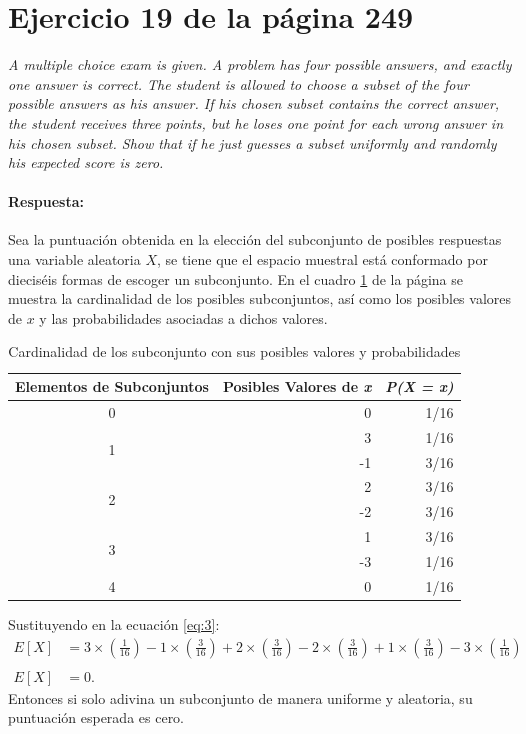 \documentclass{article}
\begin{document}
\section{Ejercicio 19 de la página 249}  
\emph{A multiple choice exam is given. A problem has four possible answers, and exactly one answer is correct. The student is allowed to choose a subset of the four possible answers as his answer. If his chosen subset contains the correct answer, the student receives three points, but he loses one point for each wrong answer in his chosen subset. Show that if he just guesses a subset uniformly and randomly his expected score is zero.}

\paragraph{Respuesta:} Sea la puntuación obtenida en la elección del subconjunto de posibles respuestas una variable aleatoria $X$, se tiene que el espacio muestral está conformado por dieciséis formas de escoger un subconjunto.  En el cuadro \ref{tab:6} de la página \pageref{tab:6} se muestra la cardinalidad de los posibles subconjuntos, así como los posibles valores de $x$ y las probabilidades asociadas a dichos valores.
\begin{table}[H]
  \centering
  \caption{Cardinalidad de los subconjunto con  sus posibles valores y probabilidades}
    \begin{tabular}{crr}
    \toprule
    \multicolumn{1}{p{7em}}{\textbf{Elementos de Subconjuntos}} & \multicolumn{1}{p{5.39em}}{\textbf{Posibles Valores de \textit{\textbf{x}}}} & \multicolumn{1}{c}{\textit{\textbf{P(X = x)}}} \\
    \midrule
    0     & 0     & 1/16 \\
    \midrule
    \multirow{2}[2]{*}{1} & 3     & 1/16 \\
          & -1    & 3/16 \\
    \midrule
    \multirow{2}[2]{*}{2} & 2     & 3/16 \\
          & -2    & 3/16 \\
    \midrule
    \multirow{2}[2]{*}{3} & 1     & 3/16 \\
          & -3    & 1/16 \\
    \midrule
    4     & 0     & 1/16 \\
    \bottomrule
    \end{tabular}%
  \label{tab:6}%
\end{table}%

Sustituyendo en la ecuación \ref{eq:3}:
\begin{equation}
\begin{array}{ll}
   E[X] &= 3\times \left(\frac{1}{16}\right) - 1\times \left(\frac{3}{16}\right)+ 2\times \left(\frac{3}{16}\right)- 2\times \left(\frac{3}{16}\right)+ 1\times \left(\frac{3}{16}\right)- 3\times \left(\frac{1}{16}\right) \\
   &\\
   E[X] & = 0. 
  
   \end{array}
   \end{equation}
    Entonces si solo adivina un subconjunto de manera uniforme y aleatoria, su puntuación esperada es cero.
    
\end{document}
